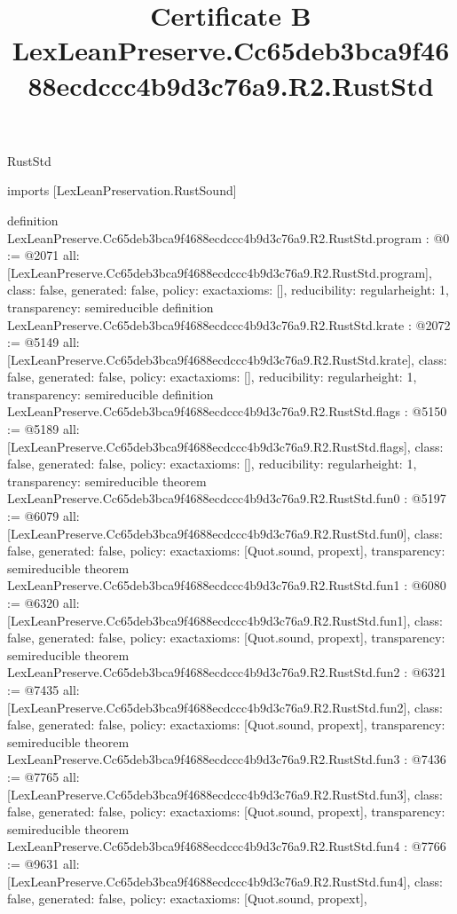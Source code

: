 \begin{lexlean}{RustStd}
\title{Certificate B LexLeanPreserve.Cc65deb3bca9f4688ecdccc4b9d3c76a9.R2.RustStd}
\begin{coremodule}
imports [LexLeanPreservation.RustSound]

definition LexLeanPreserve.Cc65deb3bca9f4688ecdccc4b9d3c76a9.R2.RustStd.program : @0 := @2071 {
  all: [LexLeanPreserve.Cc65deb3bca9f4688ecdccc4b9d3c76a9.R2.RustStd.program],
  class: false,
  generated: false,
  policy: exact{axioms: []},
  reducibility: regular{height: 1},
  transparency: semireducible
}
definition LexLeanPreserve.Cc65deb3bca9f4688ecdccc4b9d3c76a9.R2.RustStd.krate : @2072 := @5149 {
  all: [LexLeanPreserve.Cc65deb3bca9f4688ecdccc4b9d3c76a9.R2.RustStd.krate],
  class: false,
  generated: false,
  policy: exact{axioms: []},
  reducibility: regular{height: 1},
  transparency: semireducible
}
definition LexLeanPreserve.Cc65deb3bca9f4688ecdccc4b9d3c76a9.R2.RustStd.flags : @5150 := @5189 {
  all: [LexLeanPreserve.Cc65deb3bca9f4688ecdccc4b9d3c76a9.R2.RustStd.flags],
  class: false,
  generated: false,
  policy: exact{axioms: []},
  reducibility: regular{height: 1},
  transparency: semireducible
}
theorem LexLeanPreserve.Cc65deb3bca9f4688ecdccc4b9d3c76a9.R2.RustStd.fun0 : @5197 := @6079 {
  all: [LexLeanPreserve.Cc65deb3bca9f4688ecdccc4b9d3c76a9.R2.RustStd.fun0],
  class: false,
  generated: false,
  policy: exact{axioms: [Quot.sound, propext]},
  transparency: semireducible
}
theorem LexLeanPreserve.Cc65deb3bca9f4688ecdccc4b9d3c76a9.R2.RustStd.fun1 : @6080 := @6320 {
  all: [LexLeanPreserve.Cc65deb3bca9f4688ecdccc4b9d3c76a9.R2.RustStd.fun1],
  class: false,
  generated: false,
  policy: exact{axioms: [Quot.sound, propext]},
  transparency: semireducible
}
theorem LexLeanPreserve.Cc65deb3bca9f4688ecdccc4b9d3c76a9.R2.RustStd.fun2 : @6321 := @7435 {
  all: [LexLeanPreserve.Cc65deb3bca9f4688ecdccc4b9d3c76a9.R2.RustStd.fun2],
  class: false,
  generated: false,
  policy: exact{axioms: [Quot.sound, propext]},
  transparency: semireducible
}
theorem LexLeanPreserve.Cc65deb3bca9f4688ecdccc4b9d3c76a9.R2.RustStd.fun3 : @7436 := @7765 {
  all: [LexLeanPreserve.Cc65deb3bca9f4688ecdccc4b9d3c76a9.R2.RustStd.fun3],
  class: false,
  generated: false,
  policy: exact{axioms: [Quot.sound, propext]},
  transparency: semireducible
}
theorem LexLeanPreserve.Cc65deb3bca9f4688ecdccc4b9d3c76a9.R2.RustStd.fun4 : @7766 := @9631 {
  all: [LexLeanPreserve.Cc65deb3bca9f4688ecdccc4b9d3c76a9.R2.RustStd.fun4],
  class: false,
  generated: false,
  policy: exact{axioms: [Quot.sound, propext]},
}
\end{coremodule}
\end{lexlean}
